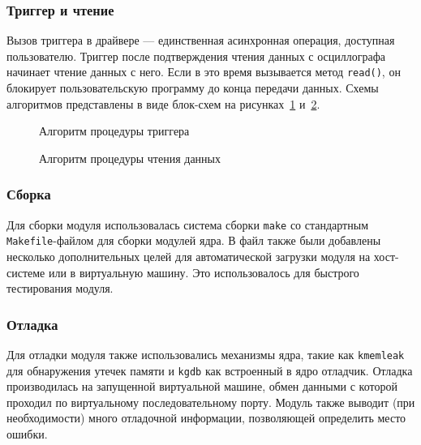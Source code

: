\documentclass[a4paper,12pt]{report}
\numberwithin{equation}{section}
\begin{document}
\subsubsection{Триггер и чтение}
Вызов триггера в драйвере --- единственная асинхронная операция, доступная
пользователю. Триггер после подтверждения чтения данных с осциллографа начинает
чтение данных с него. Если в это время вызывается метод \texttt{read()}, он
блокирует пользовательскую программу до конца передачи данных. Схемы алгоритмов
представлены в виде блок-схем на рисунках~\ref{algo1} и~\ref{algo2}.

\begin{figure}[h!]
\centering

\label{algo1}
\caption{Алгоритм процедуры триггера}
\end{figure}

\begin{figure}[h!]
\centering

\label{algo2}
\caption{Алгоритм процедуры чтения данных}
\end{figure}

\subsubsection{Сборка}
Для сборки модуля использовалась система сборки \texttt{make} со стандартным
\texttt{Makefile}-файлом для сборки модулей ядра. В файл также были добавлены
несколько дополнительных целей для автоматической загрузки модуля на
хост-системе или в виртуальную машину. Это использовалось для быстрого
тестирования модуля.

\subsubsection{Отладка}
Для отладки модуля также использовались механизмы ядра, такие как
\texttt{kmemleak} для обнаружения утечек памяти и \texttt{kgdb} как встроенный в
ядро отладчик. Отладка производилась на запущенной виртуальной машине, обмен
данными с которой проходил по виртуальному последовательному порту. Модуль также
выводит (при необходимости) много отладочной информации, позволяющей определить
место ошибки.
\end{document}
